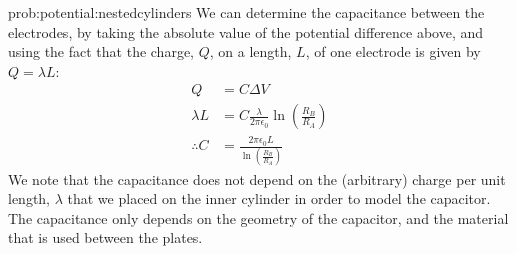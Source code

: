 \begin{solution}{prob:potential:nestedcylinders}
We can determine the capacitance between the electrodes, by taking the absolute value of the potential difference above, and using the fact that the charge, $Q$, on a length, $L$, of one electrode is given by $Q=\lambda L$:
\begin{align*}
Q &= C\Delta V\\
\lambda L &= C\frac{\lambda }{2\pi \epsilon_0}\ln\left( \frac{R_B}{R_A} \right)\\
\therefore C&=\frac{2\pi \epsilon_0 L}{\ln\left( \frac{R_B}{R_A} \right)}
\end{align*}
We note that the capacitance does not depend on the (arbitrary) charge per unit length, $\lambda$ that we placed on the inner cylinder in order to model the capacitor. The capacitance only depends on the geometry of the capacitor, and the material that is used between the plates.
\end{solution}
